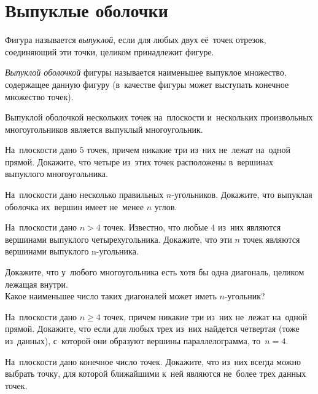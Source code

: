 
\section*{Выпуклые оболочки}

Фигура называется \emph{выпуклой}, если для любых двух её~точек отрезок,
соединяющий эти точки, целиком принадлежит фигуре.

\emph{Выпуклой оболочкой} фигуры называется наименьшее выпуклое множество,
содержащее данную фигуру (в~качестве фигуры может выступать конечное множество
точек).

\statement
Выпуклой оболочкой нескольких точек на~плоскости и~нескольких произвольных
многоугольников является выпуклый многоугольник.

\begin{problems}


\item
На~плоскости дано $5$ точек, причем никакие три из~них не~лежат на~одной
прямой.
Докажите, что четыре из~этих точек расположены в~вершинах выпуклого
многоугольника.

\item
На~плоскости дано несколько правильных $n$-угольников.
Докажите, что выпуклая оболочка их~вершин имеет не~менее $n$ углов.

\item
На~плоскости дано $n > 4$ точек.
Известно, что любые $4$ из~них являются вершинами выпуклого четырехугольника.
Докажите, что эти $n$ точек являются вершинами выпуклого n-угольника.

\item
\sp
Докажите, что у~любого многоугольника есть хотя бы одна диагональ, целиком
лежащая внутри.
\\
\sp
Какое наименьшее число таких диагоналей может иметь $n$-угольник?

\item
На~плоскости дано $n \geq 4$ точек, причем никакие три из~них не~лежат на~одной
прямой.
Докажите, что если для любых трех из~них найдется четвертая (тоже из~данных),
с~которой они образуют вершины параллелограмма, то~$n = 4$.

\item
На~плоскости дано конечное число точек.
Докажите, что из~них всегда можно выбрать точку, для которой ближайшими к~ней
являются не~более трех данных точек.

\end{problems}

